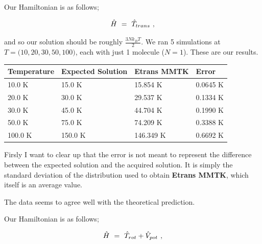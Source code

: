 \documentclass{article}
\newcounter{subsubsubsection}[subsubsection]
\begin{document}
Our Hamiltonian is as follows;

\begin{equation} \label{eb-eq-3-3}
\hat{H} \hspace{0.125cm} = \hspace{0.125cm} \hat{T}_{trans} \hspace{0.125cm} ,
\end{equation}

and so our solution should be roughly \begin{math} \frac{3 N k_{B} T}{2} \end{math}. We ran 5 simulations at \begin{math} T = \Big( 10 , 20 , 30 , 50 , 100 \Big) \end{math}, each with just 1 molecule (\begin{math} N = 1 \end{math}). These are our results.

\begin{center}
\begin{tabular*}{\textwidth}{ | p{} | p{}| p{}| p{}|}
\hline
\textbf{Temperature} & \textbf{Expected Solution} & \textbf{Etrans MMTK} & \textbf{Error} \\ 
\hline 
10.0 K & 15.0 K & 15.854 K & 0.0645 K \\ 
\hline
20.0 K & 30.0 K & 29.537 K & 0.1334 K \\
\hline 
30.0 K & 45.0 K & 44.704 K & 0.1990 K \\ 
\hline 
50.0 K & 75.0 K & 74.209 K & 0.3388 K \\
\hline 
100.0 K & 150.0 K & 146.349 K & 0.6692 K \\
\hline 
\end{tabular*}
\end{center} 

Firsly I want to clear up that the error is not meant to represent the difference between the expected solution and the acquired solution. It is simply the standard deviation of the distribution used to obtain \textbf{Etrans MMTK}, which itself is an average value. 

The data seems to agree well with the theoretical prediction. 

Our Hamiltonian is as follows;

\begin{equation} \label{eb-eq-3-4}
\hat{H} \hspace{0.125cm} = \hspace{0.125cm} \hat{T}_{rot} + \hat{V}_{pot} \hspace{0.125cm} ,
\end{equation}
\end{document}
